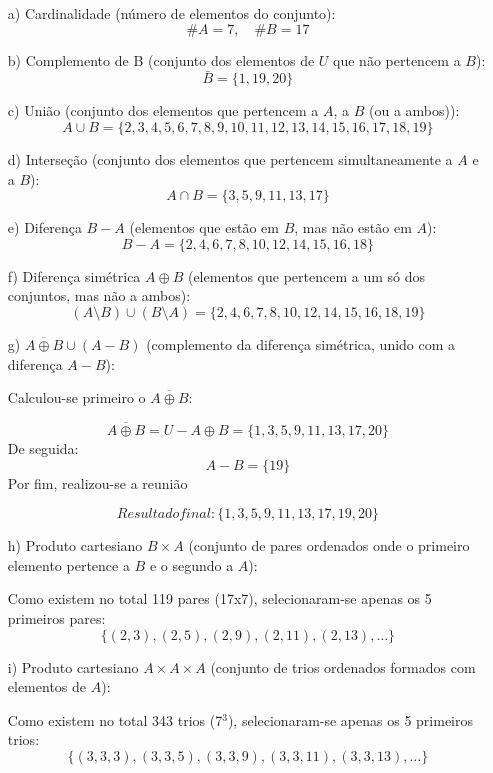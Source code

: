 \begin{enumerate}
    \item[a)] Cardinalidade (número de elementos do conjunto):
    \[
    \#A = 7, \quad \#B = 17
    \]

    \item[b)] Complemento de B (conjunto dos elementos de \(U\) que não pertencem a \(B\)):
    \[
    \bar{B} = \{1, 19, 20\}
    \]
    \item[c)] União (conjunto dos elementos que pertencem a \(A\), a \(B\) (ou a ambos)):
    \[
    A \cup B = \{2, 3, 4, 5, 6, 7, 8, 9, 10, 11, 12, 13, 14, 15, 16, 17, 18, 19\}
    \]

    \item[d)] Interseção (conjunto dos elementos que pertencem simultaneamente a \(A\) e a \(B\)):
    \[
    A \cap B = \{3, 5, 9, 11, 13, 17\}
    \]

    \item[e)] Diferença \(B - A\) (elementos que estão em \(B\), mas não estão em \(A\)):
    \[
    B - A = \{2, 4, 6, 7, 8, 10, 12, 14, 15, 16, 18\}
    \]

    \item[f)] Diferença simétrica \(A \oplus B\) (elementos que pertencem a um só dos conjuntos, mas não a ambos):
    \[
    (A \setminus B) \cup (B \setminus A) = \{2, 4, 6, 7, 8, 10, 12, 14, 15, 16, 18, 19\}
    \]

    \item[g)] \(\overline{A \oplus {B}} \cup (A - B)\) (complemento da diferença simétrica, unido com a diferença \(A - B\)):

    Calculou-se primeiro o  $\overline{A \oplus B}$:

    \[
   \overline{A \oplus {B}} =U -  A \oplus {B} =\{1,3,5,9,11,13,17,20\}
    \]
De seguida:
    \[
    A - B = \{19\}
    \]
Por fim, realizou-se a reunião

    \[
    Resultado final: \{1,3,5,9,11,13,17,19,20\}
    \]

    \item[h)] Produto cartesiano \(B \times A\) (conjunto de pares ordenados onde o primeiro elemento pertence a \(B\) e o segundo a \(A\)):
    
    Como existem no total 119 pares (17x7), selecionaram-se apenas os 5 primeiros pares:
    \[
    \{(2,3), (2,5), (2,9), (2,11), (2,13), \ldots\}
    \]

    \item[i)] Produto cartesiano \(A \times A \times A\) (conjunto de trios ordenados formados com elementos de \(A\)):

      Como existem no total 343 trios (7$^{3}$), selecionaram-se apenas os 5 primeiros trios:
    \[
    \{(3,3,3), (3,3,5), (3,3,9), (3,3,11), (3,3,13), \ldots\}
    \]
\end{enumerate}


